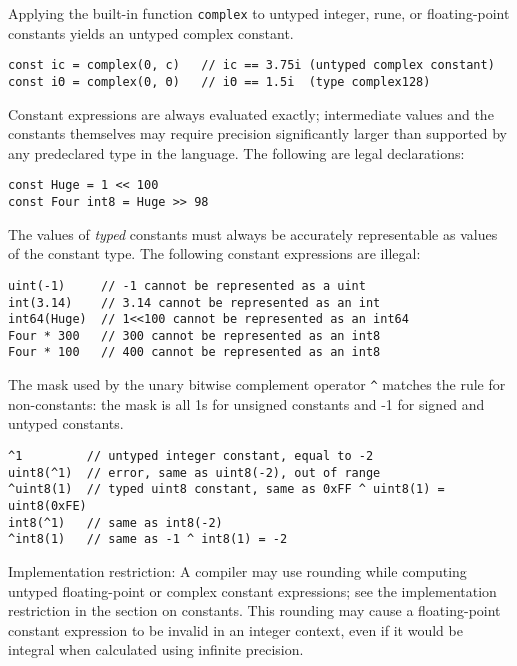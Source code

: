 {Applying the built-in function \texttt{complex} to untyped integer,
rune, or floating-point constants yields an untyped complex constant.

\begin{Verbatim}[frame=single]
const ic = complex(0, c)   // ic == 3.75i (untyped complex constant)
const iΘ = complex(0, Θ)   // iΘ == 1.5i  (type complex128)
\end{Verbatim}

Constant expressions are always evaluated exactly; intermediate values
and the constants themselves may require precision significantly larger
than supported by any predeclared type in the language. The following
are legal declarations:

\begin{Verbatim}[frame=single]
const Huge = 1 << 100
const Four int8 = Huge >> 98
\end{Verbatim}

The values of \emph{typed} constants must always be accurately
representable as values of the constant type. The following constant
expressions are illegal:

\begin{Verbatim}[frame=single]
uint(-1)     // -1 cannot be represented as a uint
int(3.14)    // 3.14 cannot be represented as an int
int64(Huge)  // 1<<100 cannot be represented as an int64
Four * 300   // 300 cannot be represented as an int8
Four * 100   // 400 cannot be represented as an int8
\end{Verbatim}

The mask used by the unary bitwise complement operator \texttt{\^{}}
matches the rule for non-constants: the mask is all 1s for unsigned
constants and -1 for signed and untyped constants.

\begin{Verbatim}[frame=single]
^1         // untyped integer constant, equal to -2
uint8(^1)  // error, same as uint8(-2), out of range
^uint8(1)  // typed uint8 constant, same as 0xFF ^ uint8(1) = uint8(0xFE)
int8(^1)   // same as int8(-2)
^int8(1)   // same as -1 ^ int8(1) = -2
\end{Verbatim}

Implementation restriction: A compiler may use rounding while computing
untyped floating-point or complex constant expressions; see the
implementation restriction in the section on
constants. This rounding may cause a
floating-point constant expression to be invalid in an integer context,
even if it would be integral when calculated using infinite precision.

}
